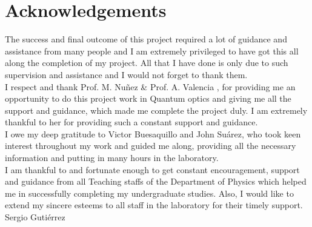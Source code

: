 \chapter*{Acknowledgements}


The success and final outcome of this project required a lot of guidance and assistance from many people and I am extremely privileged to have got this all along the completion of my project. All that I have done is only due to such supervision and assistance and I would not forget to thank them.~\\

I respect and thank Prof. M. Nuñez \& Prof. A. Valencia , for providing me an opportunity to do this project work in Quantum optics and giving me all the  support and guidance, which made me complete the project duly. I am extremely thankful to her for providing such a constant support and guidance.~\\

I owe my deep gratitude to Victor Buesaquillo and John Suárez, who took keen interest throughout my work and guided me along, providing all the necessary information and putting in  many hours in the laboratory.~\\

 
I am thankful to and fortunate enough to get constant encouragement, support and guidance from all Teaching staffs of  the Department of Physics which helped me in successfully completing my undergraduate studies. Also, I would like to extend my sincere esteems to all staff in the laboratory for their timely support.~\\

 
Sergio Gutiérrez





\tableofcontents
\listoffigures
\lstlistoflistings
\clearpage











